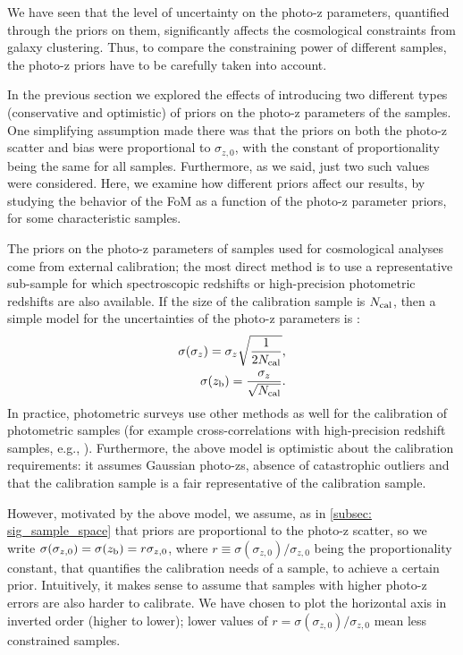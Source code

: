 \documentclass[a4paper,fleqn,usenatbib]{mnras}
\begin{document}
We have seen that the level of uncertainty on the photo-z parameters, quantified through the priors on them, significantly affects the cosmological constraints from galaxy clustering. Thus, to compare the constraining power of different samples, the photo-z priors have to be carefully taken into account.

In the previous section we explored the effects of introducing two different types (conservative and optimistic) of priors on the photo-z parameters of the samples. One simplifying assumption made there was that the priors on both the photo-z scatter and bias were proportional to $\sigma_{z,0}$, with the constant of proportionality being the same for all samples. Furthermore, as we said, just two such values were considered. Here, we examine how different priors affect our results, by studying the behavior of the FoM  as a function of the photo-z parameter priors, for some characteristic samples.

The priors on the photo-z parameters of samples used for cosmological analyses come from external calibration; the most direct method is to use a representative sub-sample for which spectroscopic redshifts or high-precision photometric redshifts are also available. If the size of the calibration sample is $N_{\mbox{\scriptsize{cal}}}$, then a simple model for the uncertainties of the photo-z parameters is \citep{Ma2006, Hearin2010, Newman2015}:
\begin{eqnarray}
\label{eq: simple_prior_model}
\sigma(\sigma_z) = \sigma_z \sqrt{\frac{1}{2N_{\mbox{\scriptsize{cal}}}}},\\
\sigma(z_{\mbox{\scriptsize{b}}}) = \frac{\sigma_z}{\sqrt{N_{\mbox{\scriptsize{cal}}}}}.
\end{eqnarray}
In practice, photometric surveys use other methods as well for the calibration of photometric samples (for example cross-correlations with high-precision redshift samples, e.g., \citealt{Cawthon2018, Gatti2018}). Furthermore, the above model is optimistic about the calibration requirements: it assumes Gaussian photo-zs, absence of catastrophic outliers and that the calibration sample is a fair representative of the calibration sample.

However, motivated by the above model, we assume, as in \ref{subsec: sig_sample_space} that priors are proportional to the photo-z scatter, so we write $\sigma(\sigma_{z,0}) = \sigma(z_{\mbox{\scriptsize{b}}}) = r  \sigma_{z,0}$, where $r \equiv \sigma(\sigma_{z,0})/\sigma_{z,0}$  being the proportionality constant, that quantifies the calibration needs of a sample, to achieve a certain prior. Intuitively, it makes sense to assume that samples with higher photo-z errors are also harder to calibrate. We  have chosen to plot the horizontal axis  in inverted order (higher to lower); lower values of $r = \sigma(\sigma_{z,0})/\sigma_{z,0}$ mean less constrained samples. 
\end{document}
